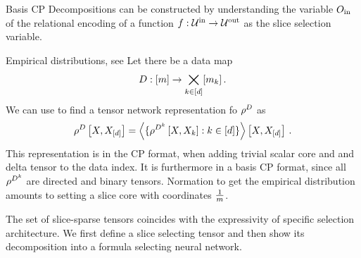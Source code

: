
Basis CP Decompositions can be constructed by understanding the variable $O_{\mathrm{in}}$ of the relational encoding of a function $f:\mathcal{U}^{\mathrm{in}} \rightarrow \mathcal{U}^{\mathrm{out}}$ as the slice selection variable.

\begin{example}{Empirical distributions, see }
	Let there be a data map 
		\[ D : [m] \rightarrow \bigtimes_{k\in[d]}[m_{k}] \, . \]
	We can use  to find a tensor network representation fo $\rho^{D}$ as
	\begin{align*}
		\rho^{D}\left[X,X_{[d]}\right]  
		= \left\langle 
		\{\rho^{D^{k}}\left[X,X_{k}\right] : k\in[d] \} 
		\right\rangle \left[ X,X_{[d]} \right] \, . 
	\end{align*}
	This representation is in the CP format, when adding trivial scalar core and and delta tensor to the data index.
	It is furthermore in a basis CP format, since all $\rho^{D^{k}}$ are directed and binary tensors.
	Normation to get the empirical distribution amounts to setting a slice core with coordinates $\frac{1}{m}$.
\end{example}





%








The set of slice-sparse tensors coincides with the expressivity of specific selection architecture.
We first define a slice selecting tensor and then show its decomposition into a formula selecting neural network.

